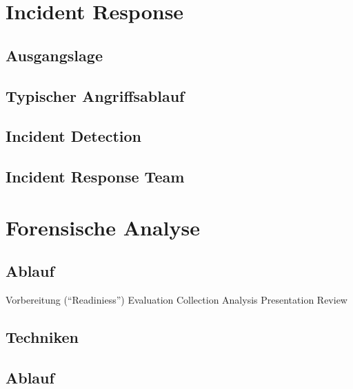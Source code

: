 \chapter{Incident Response}
\section{Ausgangslage}

\section{Typischer Angriffsablauf}

\section{Incident Detection}
\section{Incident Response Team}

\chapter{Forensische Analyse}
\section{Ablauf}
Vorbereitung ("`Readiniess"')
Evaluation
Collection
Analysis
Presentation
Review

\section{Techniken}


\section{Ablauf}
